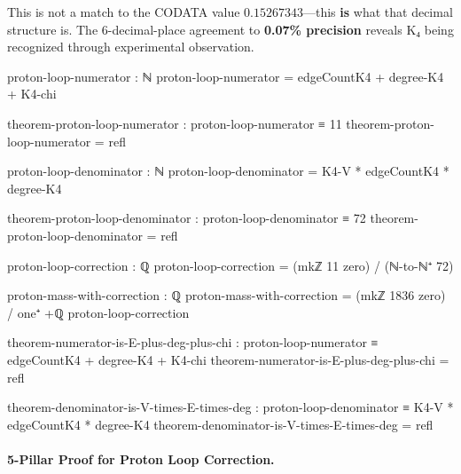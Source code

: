 \documentclass[11pt,a4paper]{book}
\begin{document}
This is not a match to the CODATA value $0.15267343$---this \textbf{is} what that decimal structure is. The 6-decimal-place agreement to \textbf{0.07\% precision} reveals K₄ being recognized through experimental observation.

\begin{code}
proton-loop-numerator : ℕ
proton-loop-numerator = edgeCountK4 + degree-K4 + K4-chi

theorem-proton-loop-numerator : proton-loop-numerator ≡ 11
theorem-proton-loop-numerator = refl

proton-loop-denominator : ℕ
proton-loop-denominator = K4-V * edgeCountK4 * degree-K4

theorem-proton-loop-denominator : proton-loop-denominator ≡ 72
theorem-proton-loop-denominator = refl

proton-loop-correction : ℚ
proton-loop-correction = (mkℤ 11 zero) / (ℕ-to-ℕ⁺ 72)

proton-mass-with-correction : ℚ
proton-mass-with-correction = (mkℤ 1836 zero) / one⁺ +ℚ proton-loop-correction

theorem-numerator-is-E-plus-deg-plus-chi : proton-loop-numerator ≡ edgeCountK4 + degree-K4 + K4-chi
theorem-numerator-is-E-plus-deg-plus-chi = refl

theorem-denominator-is-V-times-E-times-deg : proton-loop-denominator ≡ K4-V * edgeCountK4 * degree-K4
theorem-denominator-is-V-times-E-times-deg = refl
\end{code}

\paragraph{5-Pillar Proof for Proton Loop Correction.}
\end{document}
